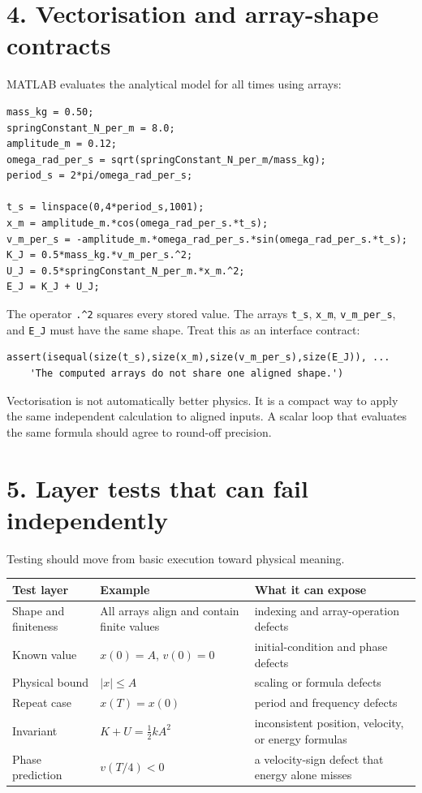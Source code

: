\documentclass[11pt,a4paper]{article}
\begin{document}
\section*{4. Vectorisation and array-shape contracts}
MATLAB evaluates the analytical model for all times using arrays:
\begin{lstlisting}[style=matlabstyle,caption={Vectorised oscillator calculation}]
mass_kg = 0.50;
springConstant_N_per_m = 8.0;
amplitude_m = 0.12;
omega_rad_per_s = sqrt(springConstant_N_per_m/mass_kg);
period_s = 2*pi/omega_rad_per_s;

t_s = linspace(0,4*period_s,1001);
x_m = amplitude_m.*cos(omega_rad_per_s.*t_s);
v_m_per_s = -amplitude_m.*omega_rad_per_s.*sin(omega_rad_per_s.*t_s);
K_J = 0.5*mass_kg.*v_m_per_s.^2;
U_J = 0.5*springConstant_N_per_m.*x_m.^2;
E_J = K_J + U_J;
\end{lstlisting}

The operator \texttt{.\^{}2} squares every stored value. The arrays \texttt{t\_s}, \texttt{x\_m}, \texttt{v\_m\_per\_s}, and \texttt{E\_J} must have the same shape. Treat this as an interface contract:
\begin{lstlisting}[style=matlabstyle]
assert(isequal(size(t_s),size(x_m),size(v_m_per_s),size(E_J)), ...
    'The computed arrays do not share one aligned shape.')
\end{lstlisting}

Vectorisation is not automatically better physics. It is a compact way to apply the same independent calculation to aligned inputs. A scalar loop that evaluates the same formula should agree to round-off precision.

\section*{5. Layer tests that can fail independently}
Testing should move from basic execution toward physical meaning.
\begin{center}
\small
\begin{tabular}{>{\raggedright\arraybackslash}p{.23\linewidth}>{\raggedright\arraybackslash}p{.43\linewidth}>{\raggedright\arraybackslash}p{.23\linewidth}}
\toprule
\textbf{Test layer} & \textbf{Example} & \textbf{What it can expose}\\ \midrule
Shape and finiteness & All arrays align and contain finite values & indexing and array-operation defects\\
Known value & $x(0)=A$, $v(0)=0$ & initial-condition and phase defects\\
Physical bound & $|x|\le A$ & scaling or formula defects\\
Repeat case & $x(T)=x(0)$ & period and frequency defects\\
Invariant & $K+U=\tfrac12 kA^2$ & inconsistent position, velocity, or energy formulas\\
Phase prediction & $v(T/4)<0$ & a velocity-sign defect that energy alone misses\\ \bottomrule
\end{tabular}
\end{center}
\end{document}
